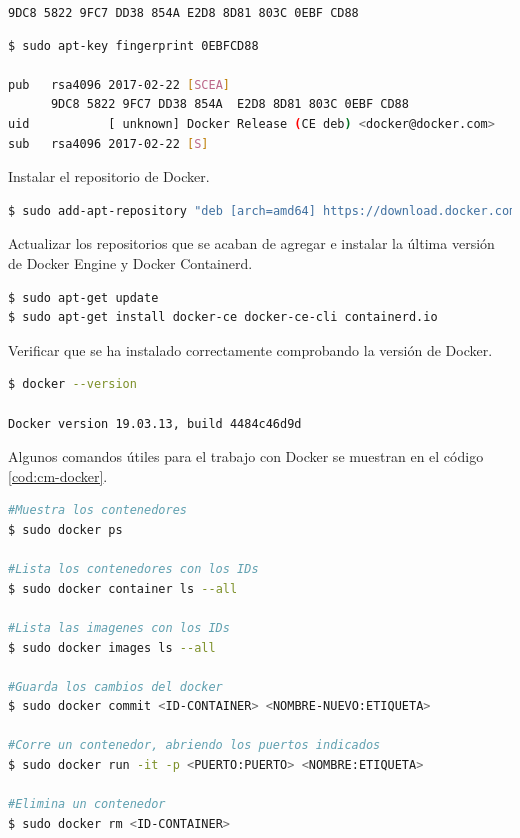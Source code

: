 \texttt{9DC8 5822 9FC7 DD38 854A  E2D8 8D81 803C 0EBF CD88}\\

\begin{lstlisting}[language=Bash,caption=Instalación Docker. Parte IV, label=cod:suma-cuerpo, style=Consola]
$ sudo apt-key fingerprint 0EBFCD88

pub   rsa4096 2017-02-22 [SCEA]
      9DC8 5822 9FC7 DD38 854A  E2D8 8D81 803C 0EBF CD88
uid           [ unknown] Docker Release (CE deb) <docker@docker.com>
sub   rsa4096 2017-02-22 [S]
\end{lstlisting}

Instalar el repositorio de Docker.\\ 

\begin{lstlisting}[language=Bash,caption=Instalación Docker. Parte V, label=cod:suma-cuerpo, style=Consola]
$ sudo add-apt-repository "deb [arch=amd64] https://download.docker.com/linux/ubuntu $(lsb_release -cs) stable"
\end{lstlisting}

Actualizar los repositorios que se acaban de agregar e instalar la última versión de Docker Engine y Docker Containerd.\\


\begin{lstlisting}[language=Bash,caption=Instalación Docker. Parte VI, label=cod:suma-cuerpo, style=Consola]
$ sudo apt-get update
$ sudo apt-get install docker-ce docker-ce-cli containerd.io
\end{lstlisting}

Verificar que se ha instalado correctamente comprobando la versión de Docker.\\

\begin{lstlisting}[language=Bash,caption=Instalación Docker. Parte VII, label=cod:suma-cuerpo, style=Consola]
$ docker --version

Docker version 19.03.13, build 4484c46d9d
\end{lstlisting}

Algunos comandos útiles para el trabajo con Docker se muestran en el código \ref{cod:cm-docker}.

\begin{lstlisting}[language=Bash,caption=Comandos útiles de Docker, label=cod:cm-docker]
#Muestra los contenedores
$ sudo docker ps

#Lista los contenedores con los IDs
$ sudo docker container ls --all

#Lista las imagenes con los IDs
$ sudo docker images ls --all 

#Guarda los cambios del docker
$ sudo docker commit <ID-CONTAINER> <NOMBRE-NUEVO:ETIQUETA>

#Corre un contenedor, abriendo los puertos indicados
$ sudo docker run -it -p <PUERTO:PUERTO> <NOMBRE:ETIQUETA>

#Elimina un contenedor
$ sudo docker rm <ID-CONTAINER>
\end{lstlisting}

